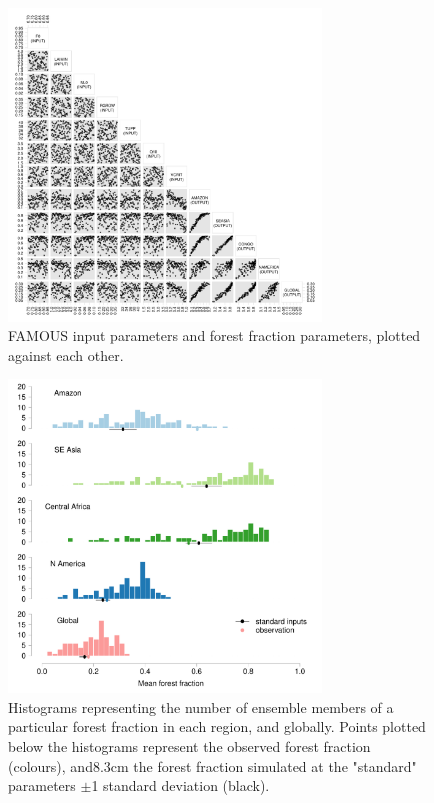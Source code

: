 \documentclass[esd, article]{copernicus} %
\begin{document}
\begin{figure}[t]
\includegraphics[width=8.3cm]{graphics/frac_pairs.pdf}
\caption{FAMOUS input parameters and forest fraction parameters, plotted against each other.}
\label{fig:frac_pairs}
\end{figure}

\begin{figure}[t]
\includegraphics[width=8.3cm]{graphics/fraction_histogram_with_discrepancy_standard.pdf}
\caption{Histograms representing the number of ensemble members of a particular forest fraction in each region, and globally. Points plotted below the histograms represent the observed forest fraction (colours), and8.3cm the forest fraction simulated at the "standard" parameters $\pm$1 standard deviation (black).}
\label{fig:fraction_histogram_with_discrepancy_standard}
\end{figure}
\end{document}
